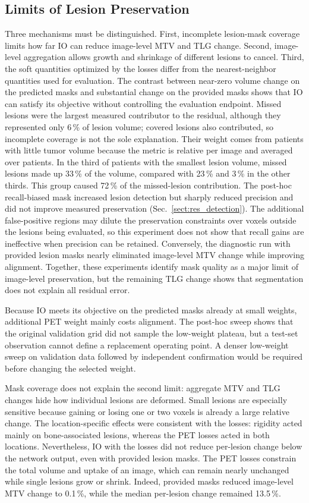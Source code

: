 \subsection{Limits of Lesion Preservation}
Three mechanisms must be distinguished.
First, incomplete lesion-mask coverage limits how far IO can reduce image-level MTV and TLG change.
Second, image-level aggregation allows growth and shrinkage of different lesions to cancel.
Third, the soft quantities optimized by the losses differ from the nearest-neighbor quantities used for evaluation.
The contrast between near-zero volume change on the predicted masks and substantial change on the provided masks shows that IO can satisfy its objective without controlling the evaluation endpoint.
Missed lesions were the largest measured contributor to the residual, although they represented only 6\,\% of lesion volume; covered lesions also contributed, so incomplete coverage is not the sole explanation.
Their weight comes from patients with little tumor volume because the metric is relative per image and averaged over patients.
In the third of patients with the smallest lesion volume, missed lesions made up 33\,\% of the volume, compared with 23\,\% and 3\,\% in the other thirds.
This group caused 72\,\% of the missed-lesion contribution.
The post-hoc recall-biased mask increased lesion detection but sharply reduced precision and did not improve measured preservation (Sec.~\ref{sect:res_detection}).
The additional false-positive regions may dilute the preservation constraints over voxels outside the lesions being evaluated, so this experiment does not show that recall gains are ineffective when precision can be retained.
Conversely, the diagnostic run with provided lesion masks nearly eliminated image-level MTV change while improving alignment.
Together, these experiments identify mask quality as a major limit of image-level preservation, but the remaining TLG change shows that segmentation does not explain all residual error.

Because IO meets its objective on the predicted masks already at small weights, additional PET weight mainly costs alignment.
The post-hoc sweep shows that the original validation grid did not sample the low-weight plateau, but a test-set observation cannot define a replacement operating point.
A denser low-weight sweep on validation data followed by independent confirmation would be required before changing the selected weight.

Mask coverage does not explain the second limit: aggregate MTV and TLG changes hide how individual lesions are deformed.
Small lesions are especially sensitive because gaining or losing one or two voxels is already a large relative change.
The location-specific effects were consistent with the losses: rigidity acted mainly on bone-associated lesions, whereas the PET losses acted in both locations.
Nevertheless, IO with the losses did not reduce per-lesion change below the network output, even with provided lesion masks.
The PET losses constrain the total volume and uptake of an image, which can remain nearly unchanged while single lesions grow or shrink.
Indeed, provided masks reduced image-level MTV change to 0.1\,\%, while the median per-lesion change remained 13.5\,\%.

